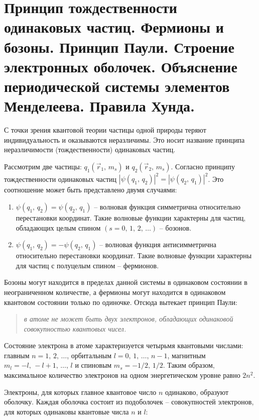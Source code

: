 \chapter{Принцип тождественности одинаковых частиц. Фермионы и бозоны. 
Принцип Паули. Строение электронных оболочек. Объяснение периодической 
системы элементов Менделеева. Правила Хунда.}

С точки зрения квантовой теории частицы одной природы теряют индивидуальность и
оказываются неразличимы. Это носит название принципа неразличимости
(тождественности) одинаковых частиц.

Рассмотрим две частицы: \( q_1(\vec{r}_1,\,m_s) \) и \( q_2(\vec{r}_2,\,
m_s) \). Согласно принципу тождественности одинаковых частиц
\( |\psi(q_1,\,q_2)|^2 = |\psi(q_2,\,q_1)|^2 \). Это соотношение может быть
представлено двумя случаями:
\begin{enumerate}
    \item \( \psi(q_1,\,q_2) = \psi(q_2,\,q_1) \) -- волновая функция
    симметрична относительно перестановки координат. Такие волновые функции
    характерны для частиц, обладающих целым спином \( (s = 0,\,1,\,2,\,\ldots)
    \) -- бозонов.
    
    \item \( \psi(q_1,\,q_2) = -\psi(q_2,\,q_1) \) -- волновая функция
    антисимметрична относительно перестановки координат. Такие волновые функции
    характерны для частиц с полуцелым спином -- фермионов.
\end{enumerate}

Бозоны могут находится в пределах данной системы в одинаковом состоянии в
неограниченном количестве, а фермионы могут находится в одинаковом квантовом
состоянии только по одиночке. Отсюда вытекает принцип Паули:

\begin{quote}
\emph{в атоме не может быть двух электронов, обладающих одинаковой
совокупностью квантовых чисел.}
\end{quote}

Состояние электрона в атоме характеризуется четырьмя квантовыми числами: главным
\( n = 1,\,2,\,\ldots \), орбитальным \( l = 0,\,1,\,\ldots,\,n - 1 \),
магнитным \( m_l = -l,\,-l + 1,\,\ldots,\, l \) и спиновым \( m_s = -1/2,\,
1/2 \). Таким образом, максимальное количество электронов на одном
энергетическом уровне равно \( 2n^2 \).

Электроны, для которых главное квантовое число \( n \) одинаково, образуют
оболочку. Каждая оболочка состоит из подоболочек -- совокупностей электронов,
для которых одинаковы квантовые числа \( n \) и \( l \):

